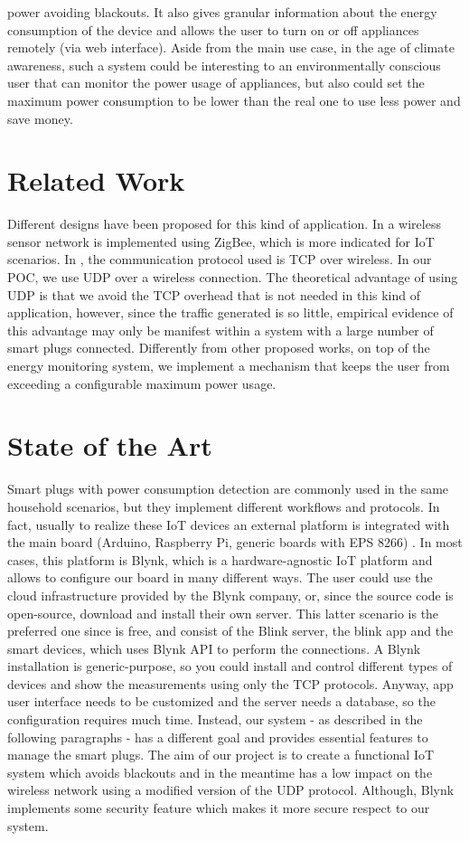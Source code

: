 \documentclass[conference]{IEEEtran}
\begin{document}
power avoiding blackouts. It also gives granular information about the energy consumption of the device and allows the user to turn on or off appliances remotely (via web interface). Aside from the main use case, in the age of climate awareness, such a system could be interesting to an environmentally conscious user that can monitor the power usage of appliances, but also could set the maximum power consumption to be lower than the real one to use less power and save money.
	
	\section{Related Work}
	Different designs have been proposed for this kind of application. In \cite{7884488} a wireless sensor network is implemented using ZigBee, which is more indicated for IoT scenarios. In \cite{8612412}, \cite{8110428} the communication protocol used is TCP over wireless. In our POC, we use UDP over a wireless connection. The theoretical advantage of using UDP is that we avoid the TCP overhead that is not needed in this kind of application, however, since the traffic generated is so little, empirical evidence of this advantage may only be manifest within a system with a large number of smart plugs connected. Differently from other proposed works, on top of the energy monitoring system, we implement a mechanism that keeps the user from exceeding a configurable maximum power usage. 
	
	\section{State of the Art}
	Smart plugs with power consumption detection are commonly used in the same household scenarios, but they implement different workflows and protocols. In fact, usually to realize these IoT devices an external platform is integrated with the main board (Arduino, Raspberry Pi, generic boards with EPS 8266) . In most cases, this platform is Blynk, which is a hardware-agnostic IoT platform and allows to configure our board in many different ways.
	The user could use the cloud infrastructure provided by the Blynk company, or, since the source code is open-source, download and install their own server. 
	This latter scenario is the preferred one since is free, and consist of the Blink server, the blink app and the smart devices, which uses Blynk API to perform the connections. A Blynk installation is generic-purpose, so you could install and control different types of devices and show the measurements using only the TCP protocols. Anyway, app user interface needs to be customized and the server needs a database, so the configuration requires much time. Instead, our system - as described in the following paragraphs - has a different goal and provides essential features to manage the smart plugs. The aim of our project is to create a functional IoT system which avoids blackouts and in the meantime has a low impact on the wireless network using a modified version of the UDP protocol.
	Although, Blynk implements some security feature which makes it more secure respect to our system.  
\end{document}
